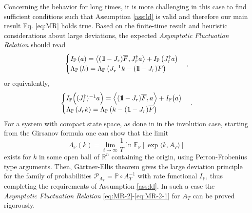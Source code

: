 \documentclass[a4paper,11pt]{article}
\numberwithin{equation}{section}
\newcommand{\bbbone}{\mathchoice {\rm 1\mskip-4mu l} {\rm 1\mskip-4mu l}
{\rm 1\mskip-4.5mu l} {\rm 1\mskip-5mu l}}
\begin{document}
Concerning the behavior for long times, it is more challenging in this case to find sufficient conditions such that Assumption \ref{ass:ld} is valid and therefore our main result Eq. \eqref{eq:MR} holds true. Based on the finite-time result and heuristic considerations about large deviations, the expected \emph{Asymptotic Fluctuation Relation} should read
\begin{equation}\label{eq:MR-2}
\begin{cases}
 I_{\mathbb{P}}\left(a\right)=\left\langle (\bbbone -J_r) \overline{F},J_{r}^\dag a\right\rangle +I_{\mathbb{P}}\left(J_{r}^\dag a\right)\\
 \Lambda_{\mathbb{P}}\left(k\right)=\Lambda_{\mathbb{P}}\left(J_{r}^{-1} k- (\bbbone -J_r) \overline{F}\right) 
\end{cases},
\end{equation}
or equivalently,
\begin{equation}\label{eq:MR-2-1}
\begin{cases}
I_{\mathbb{P}}\Big((J_r^\dag)^{-1} a\Big)=\Big\langle (\bbbone -J_r) \overline{F}, a\Big\rangle +I_{\mathbb{P}}\big(a\big)\\ \Lambda_{\mathbb{P}}\left(J_{r} k\right)=\Lambda_{\mathbb{P}}\left(k - (\bbbone -J_r) \overline{F}\right) 
\end{cases}.
\end{equation} 
For a system with compact state space, as done in \cite{LS99} in the involution case, starting from the Girsanov formula one can show that the limit 
\begin{equation}
    \Lambda_{\mathbb{P}}(k) = \lim_{t \to \infty} \frac{1}{T} \ln \mathbb{E}_{\mathbb{P}}\left[\exp\Big\langle k,A_T\Big\rangle \right]
\end{equation}
exists for $k$ in some open ball of $\mathbb{R}^n$ containing the origin, using Perron-Frobenius type arguments. Then, G\"artner-Ellis theorem gives the large deviation principle for the family of probabilities $\mathcal{P}_{A_T}=\mathbb{P} \circ A_T^{-1}$ with rate functional $I_{\mathbb{P}}$, thus completing the requirements of Assumption \ref{ass:ld}. In such a case the \emph{Asymptotic Fluctuation Relation} \eqref{eq:MR-2}-\eqref{eq:MR-2-1} for $A_T$ can be proved rigorously.
\end{document}
